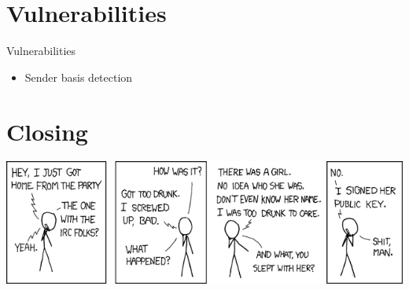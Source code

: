 \documentclass{beamer}
\begin{document}
	\section{Vulnerabilities}

	\begin{frame}{Vulnerabilities} %
		\begin{itemize}
			\item Sender basis detection
		\end{itemize}
	\end{frame}

	\section{Closing}

	\begin{frame}
		\begin{center}
		\includegraphics[width=\textwidth]{images/xkcd-responsible_behavior}
		\end{center}
	\end{frame}


	\begin{frame}[plain]\end{frame}
\end{document}
